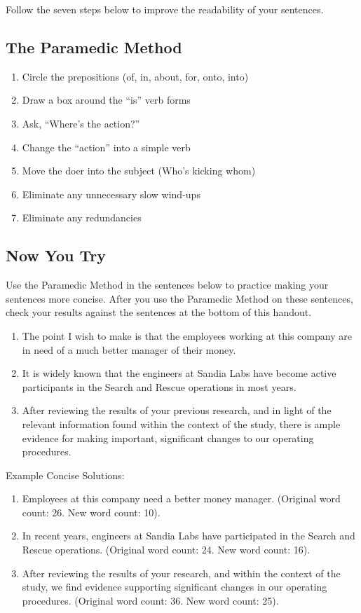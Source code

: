 \documentclass[11pt]{article}
\begin{document}
Follow the seven steps below to improve the readability of your sentences.

\subsection{The Paramedic Method}

\begin{enumerate}
\item Circle the prepositions (of, in, about, for, onto, into)
\item Draw a box around the “is” verb forms
\item Ask, “Where's the action?”
\item Change the “action” into a simple verb
\item Move the doer into the subject (Who's kicking whom)
\item Eliminate any unnecessary slow wind-ups
\item Eliminate any redundancies
\end{enumerate}

\subsection{Now You Try}

Use the Paramedic Method in the sentences below to practice making your
sentences more concise. After you use the Paramedic Method on these
sentences, check your results against the sentences at the bottom of
this handout.

\begin{enumerate}
\item The point I wish to make is that the employees working at this company are in need of a much better manager of their money.
\item It is widely known that the engineers at Sandia Labs have become active participants in the Search and Rescue operations in most years.
\item After reviewing the results of your previous research, and in light of the relevant information found within the context of the study, there is ample evidence for making important, significant changes to our operating procedures.
\end{enumerate}

Example Concise Solutions:

\begin{enumerate}
\item Employees at this company need a better money manager. (Original word count: 26. New word count: 10).
\item In recent years, engineers at Sandia Labs have participated in the Search and Rescue operations. (Original word count: 24. New word count: 16).
\item After reviewing the results of your research, and within the context of the study, we find evidence supporting significant changes in our operating procedures. (Original word count: 36. New word count: 25).
\end{enumerate}
\end{document}
